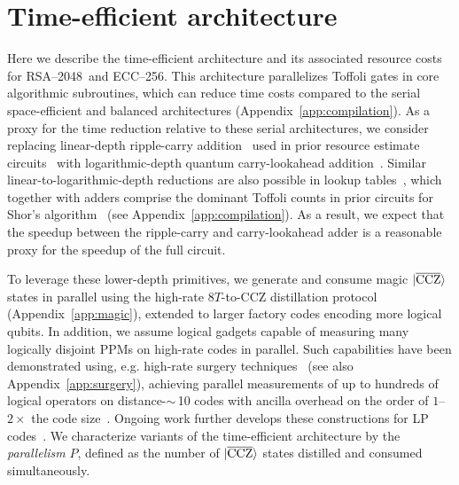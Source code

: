 \documentclass[reprint,twocolumn,secnumarabic,amssymb, aps, prx]{revtex4-2}
\newcommand{\ecc}{\mbox{ECC--256}}
\newcommand{\rsa}{\mbox{RSA--2048}}
\newcommand{\ccz}{\ket{\overline{\text{CCZ}}}}
\begin{document}
\section{Time-efficient architecture\label{app:time_efficient}}

Here we describe the time-efficient architecture and its associated resource costs for \rsa\ and \ecc. This architecture parallelizes Toffoli gates in core algorithmic subroutines, which can reduce time costs compared to the serial space-efficient and balanced architectures (Appendix~\ref{app:compilation}). As a proxy for the time reduction relative to these serial architectures, we consider replacing linear-depth ripple-carry addition~\cite{cuccaro2004new} used in prior resource estimate circuits~\cite{gidney2019how, gidney2025how, chevignard2025reducing, proos2003shor, roetteler2017quantum, haner2020improved, litinski2023compute, gouzien2023performance} with logarithmic-depth quantum carry-lookahead addition~\cite{draper2004logarithmic}. Similar linear-to-logarithmic-depth reductions are also possible in lookup tables~\cite{zhu2024unified}, which together with adders comprise the dominant Toffoli counts in prior circuits for Shor's algorithm~\cite{jones2012layered, fowler2012surface, ogorman2017quantum, gheorghiu2019benchmarking, gidney2019how, dallairedemers2025brace, gidney2025how, zhou2025resource, webster2026pinnacle, chevignard2025reducing, proos2003shor, roetteler2017quantum, haner2020improved, litinski2023compute, gouzien2023performance} (see Appendix~\ref{app:compilation}). As a result, we expect that the speedup between the ripple-carry and carry-lookahead adder is a reasonable proxy for the speedup of the full circuit.

To leverage these lower-depth primitives, we generate and consume magic $\ccz$ states in parallel using the high-rate $8T$-to-CCZ distillation protocol (Appendix~\ref{app:magic}), extended to larger factory codes encoding more logical qubits. In addition, we assume logical gadgets capable of measuring many logically disjoint PPMs on high-rate codes in parallel. Such capabilities have been demonstrated using, e.g. high-rate surgery techniques~\cite{zhang2025time, cowtan2025parallel, zheng2025high} (see also Appendix~\ref{app:surgery}), achieving parallel measurements of up to hundreds of logical operators on distance-$\sim$\,10 codes with ancilla overhead on the order of $1$–$2\times$ the code size~\cite{zhang2025time}. Ongoing work further develops these constructions for LP codes~\cite{zheng2026high}. We characterize variants of the time-efficient architecture by the \textit{parallelism} $P$, defined as the number of $\ccz$ states distilled and consumed simultaneously.
\end{document}
